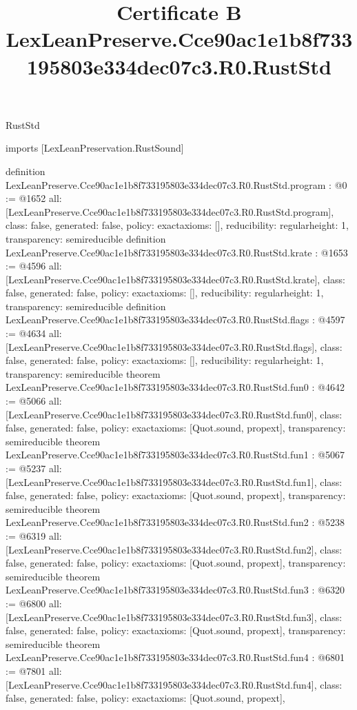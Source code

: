 \begin{lexlean}{RustStd}
\title{Certificate B LexLeanPreserve.Cce90ac1e1b8f733195803e334dec07c3.R0.RustStd}
\begin{coremodule}
imports [LexLeanPreservation.RustSound]

definition LexLeanPreserve.Cce90ac1e1b8f733195803e334dec07c3.R0.RustStd.program : @0 := @1652 {
  all: [LexLeanPreserve.Cce90ac1e1b8f733195803e334dec07c3.R0.RustStd.program],
  class: false,
  generated: false,
  policy: exact{axioms: []},
  reducibility: regular{height: 1},
  transparency: semireducible
}
definition LexLeanPreserve.Cce90ac1e1b8f733195803e334dec07c3.R0.RustStd.krate : @1653 := @4596 {
  all: [LexLeanPreserve.Cce90ac1e1b8f733195803e334dec07c3.R0.RustStd.krate],
  class: false,
  generated: false,
  policy: exact{axioms: []},
  reducibility: regular{height: 1},
  transparency: semireducible
}
definition LexLeanPreserve.Cce90ac1e1b8f733195803e334dec07c3.R0.RustStd.flags : @4597 := @4634 {
  all: [LexLeanPreserve.Cce90ac1e1b8f733195803e334dec07c3.R0.RustStd.flags],
  class: false,
  generated: false,
  policy: exact{axioms: []},
  reducibility: regular{height: 1},
  transparency: semireducible
}
theorem LexLeanPreserve.Cce90ac1e1b8f733195803e334dec07c3.R0.RustStd.fun0 : @4642 := @5066 {
  all: [LexLeanPreserve.Cce90ac1e1b8f733195803e334dec07c3.R0.RustStd.fun0],
  class: false,
  generated: false,
  policy: exact{axioms: [Quot.sound, propext]},
  transparency: semireducible
}
theorem LexLeanPreserve.Cce90ac1e1b8f733195803e334dec07c3.R0.RustStd.fun1 : @5067 := @5237 {
  all: [LexLeanPreserve.Cce90ac1e1b8f733195803e334dec07c3.R0.RustStd.fun1],
  class: false,
  generated: false,
  policy: exact{axioms: [Quot.sound, propext]},
  transparency: semireducible
}
theorem LexLeanPreserve.Cce90ac1e1b8f733195803e334dec07c3.R0.RustStd.fun2 : @5238 := @6319 {
  all: [LexLeanPreserve.Cce90ac1e1b8f733195803e334dec07c3.R0.RustStd.fun2],
  class: false,
  generated: false,
  policy: exact{axioms: [Quot.sound, propext]},
  transparency: semireducible
}
theorem LexLeanPreserve.Cce90ac1e1b8f733195803e334dec07c3.R0.RustStd.fun3 : @6320 := @6800 {
  all: [LexLeanPreserve.Cce90ac1e1b8f733195803e334dec07c3.R0.RustStd.fun3],
  class: false,
  generated: false,
  policy: exact{axioms: [Quot.sound, propext]},
  transparency: semireducible
}
theorem LexLeanPreserve.Cce90ac1e1b8f733195803e334dec07c3.R0.RustStd.fun4 : @6801 := @7801 {
  all: [LexLeanPreserve.Cce90ac1e1b8f733195803e334dec07c3.R0.RustStd.fun4],
  class: false,
  generated: false,
  policy: exact{axioms: [Quot.sound, propext]},
}
\end{coremodule}
\end{lexlean}
